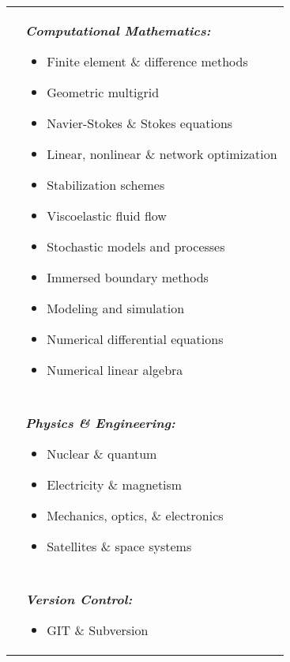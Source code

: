 \documentclass[10pt]{article}
\begin{document}
\begin{multicols}{2}
\hskip-1.0in
\begin{tabularx}{1.5\linewidth}{>{\raggedleft\scshape}p{3cm}X}
  &\textbf{\textit{Computational Mathematics:}}\begin{itemize}
  \setlength\itemsep{.005em}
  \item Finite element \& difference methods
  \item Geometric multigrid
  \item Navier-Stokes \& Stokes equations
  \item Linear, nonlinear \& network optimization
  \item Stabilization schemes 
  \item Viscoelastic fluid flow
  \item Stochastic models and processes
  \item Immersed boundary methods
  \item Modeling and simulation
  \item Numerical differential equations
  \item Numerical linear algebra

\end{itemize} \\
\\
  &\textbf{\textit{Physics \& Engineering:}}\begin{itemize}
  \setlength\itemsep{.005em}
  \item Nuclear \& quantum  
  \item Electricity \& magnetism
  \item Mechanics, optics, \& electronics
  \item Satellites \& space systems
  \end{itemize} \\
  \\
  &\textbf{\textit{Version Control:}}\begin{itemize}
  \setlength\itemsep{.005em}
  \item GIT \& Subversion
\end{itemize} 
 
\end{tabularx}
\end{multicols}
\end{document}
